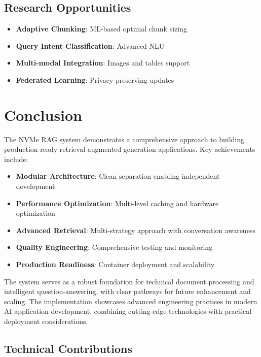 \documentclass[10pt,a4paper,twocolumn]{article}
\begin{document}
\subsection{Research Opportunities}

\begin{itemize}[leftmargin=1em]
    \item \textbf{Adaptive Chunking}: ML-based optimal chunk sizing
    \item \textbf{Query Intent Classification}: Advanced NLU
    \item \textbf{Multi-modal Integration}: Images and tables support
    \item \textbf{Federated Learning}: Privacy-preserving updates
\end{itemize}

\section{Conclusion}

The NVMe RAG system demonstrates a comprehensive approach to building production-ready retrieval-augmented generation applications. Key achievements include:

\begin{itemize}[leftmargin=1em]
    \item \textbf{Modular Architecture}: Clean separation enabling independent development
    \item \textbf{Performance Optimization}: Multi-level caching and hardware optimization
    \item \textbf{Advanced Retrieval}: Multi-strategy approach with conversation awareness
    \item \textbf{Quality Engineering}: Comprehensive testing and monitoring
    \item \textbf{Production Readiness}: Container deployment and scalability
\end{itemize}

The system serves as a robust foundation for technical document processing and intelligent question-answering, with clear pathways for future enhancement and scaling. The implementation showcases advanced engineering practices in modern AI application development, combining cutting-edge technologies with practical deployment considerations.

\subsection{Technical Contributions}
\end{document}
